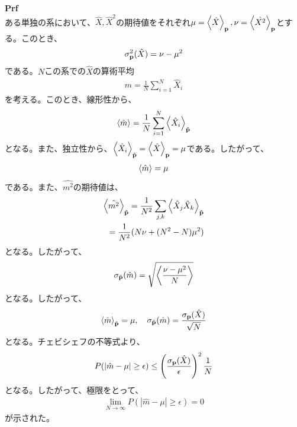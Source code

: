 \documentclass[a4paper,11pt]{jsarticle}
\numberwithin{equation}{section}
\begin{document}
\textbf{Prf}\\
ある単独の系において、$\hat{X},\hat{X}^2$の期待値をそれぞれ$\mu=\ev{\hat{X}}_{\vb{p}},\nu=\ev{\hat{X^2}}_{\vb{p}}$とする。このとき、
\begin{align}
  \sigma^2_{\vb{p}}(\hat{X}) = \nu - \mu^2
\end{align}
である。$N$この系での$\hat{X}$の算術平均
\begin{align}
  \hat{m} = \frac{1}{N} \sum_{i=1}^{N} \hat{X}_i
\end{align}
を考える。このとき、線形性から、
\begin{align}
  \expval{\hat{m}} = \frac{1}{N} \sum_{i=1}^{N} \expval{\hat{X}_i}_{\tilde{\vb{p}}} 
\end{align}
となる。また、独立性から、$\ev{\hat{X}_i}_{\tilde{\vb{p}}} = \ev{\hat{X}}_{\vb{p}}=\mu$である。したがって、
\begin{align}
  \expval{\hat{m}} = \mu
\end{align}
である。また、$\hat{m^2}$の期待値は、
\begin{align}
  \expval{\hat{m^2}}_{\tilde{\vb{p}}} = \frac{1}{N^2} \sum_{j,k} \expval{\hat{X}_j \hat{X}_k}_{\tilde{\vb{p}}}\\
  = \frac{1}{N^2} (N\nu + (N^2-N)\mu^2)
\end{align}
となる。したがって、
\begin{align}
  \sigma_{\tilde{\vb{p}}}(\hat{m}) = \sqrt{\expval{\frac{\nu - \mu^2}{N}}}
\end{align}
となる。したがって、
\begin{align}
  \ev{\hat{m}}_{\tilde{\vb{p}}} = \mu, \quad \sigma_{\tilde{\vb{p}}}(\hat{m}) = \frac{\sigma_{\vb{p}}(\hat{X})}{\sqrt{N}}
\end{align}
となる。チェビシェフの不等式より、
\begin{align}
  P(|\hat{m} - \mu| \geq \epsilon) \leq \left(\frac{\sigma_{\vb{p}}(\hat{X})}{\epsilon}\right)^2 \frac{1}{N}
\end{align}
となる。したがって、極限をとって、
\begin{align}
  \lim_{N \to \infty} P(|\hat{m} - \mu| \geq \epsilon) = 0
\end{align}
が示された。\hfill\qedsymbol\\
\end{document}
